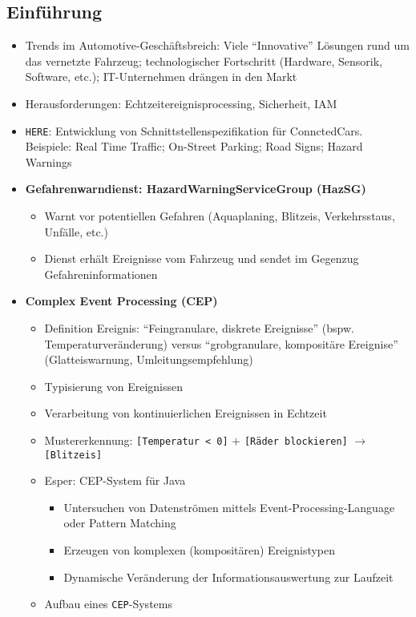 \subsection{Einführung}
\begin{itemize}
	\item Trends im Automotive-Geschäftsbreich: Viele "`Innovative"' Lösungen rund um das vernetzte Fahrzeug; technologischer Fortschritt (Hardware, Sensorik, Software, etc.); IT-Unternehmen drängen in den Markt
	\item Herausforderungen: Echtzeitereignisprocessing, Sicherheit, IAM
	\item \texttt{HERE}: Entwicklung von Schnittstellenspezifikation für ConnctedCars. Beispiele: Real Time Traffic; On-Street Parking; Road Signs; Hazard Warnings
	\item \textbf{Gefahrenwarndienst: HazardWarningServiceGroup (HazSG)}
	\begin{itemize}
		\item Warnt vor potentiellen Gefahren (Aquaplaning, Blitzeis, Verkehrsstaus, Unfälle, etc.)
		\item Dienst erhält Ereignisse vom Fahrzeug und sendet im Gegenzug Gefahreninformationen
	\end{itemize}
	\item \textbf{Complex Event Processing (CEP)}
	\begin{itemize}
		\item Definition Ereignis: "`Feingranulare, diskrete Ereignisse"' (bspw. Temperaturveränderung) versus "`grobgranulare, kompositäre Ereignise"' (Glatteiswarnung, Umleitungsempfehlung)
		\item Typisierung von Ereignissen
		\item Verarbeitung von kontinuierlichen Ereignissen in Echtzeit
		\item Mustererkennung: \texttt{[Temperatur < 0]} \(+\) \texttt{[Räder blockieren]} \(\rightarrow\) \texttt{[Blitzeis]}
		\item Esper: CEP-System für Java
		\begin{itemize}
			\item Untersuchen von Datenströmen mittels Event-Processing-Language oder Pattern Matching
			\item Erzeugen von komplexen (kompositären) Ereignistypen
			\item Dynamische Veränderung der Informationsauswertung zur Laufzeit
		\end{itemize}
		\item Aufbau eines \texttt{CEP}-Systems

\end{itemize}
\end{itemize}

